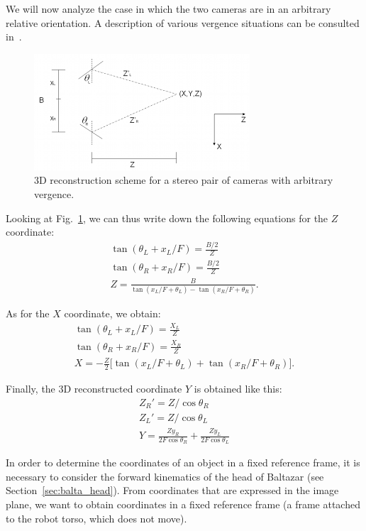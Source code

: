 We will now analyze the case in which the two cameras are in an arbitrary relative orientation. A description of various vergence situations can be consulted in~\cite{bernardino:1999}.

\begin{figure}
\centering
\includegraphics{figures/vergence}
\caption[3D reconstruction scheme]{3D reconstruction scheme for a stereo pair of cameras with arbitrary vergence.}
\label{img:vergence}
\end{figure}

Looking at Fig.~\ref{img:vergence}, we can thus write down the following equations for the $Z$ coordinate:
%
\begin{gather}
\tan (\theta_L + x_L / F) = \frac{B/2}{Z} \\
\tan (\theta_R + x_R / F) = \frac{B/2}{Z} \\
Z = \frac{B}{\tan(x_L / F + \theta_L) - \tan(x_R / F + \theta_R)}.
\end{gather}

As for the $X$ coordinate, we obtain:
%
\begin{gather}
\tan(\theta_L + x_L / F) = \frac{X_L}{Z} \\
\tan(\theta_R + x_R / F) = \frac{X_R}{Z} \\
X = - \frac{Z}{2} \bigl[ \tan(x_L / F + \theta_L) + \tan(x_R / F + \theta_R) \bigr].
\end{gather}

Finally, the 3D reconstructed coordinate $Y$ is obtained like this:
%
\begin{gather}
Z_{R}' = Z / \cos \theta_R \\
Z_{L}' = Z / \cos \theta_L \\
Y = \frac{Z y_R}{2 F \cos \theta_R} + \frac{Z y_L}{2 F \cos \theta_L}
\end{gather}










In order to determine the coordinates of an object in a fixed reference frame, it is necessary to consider the forward kinematics of the head of Baltazar (see Section~\ref{sec:balta_head}). From coordinates that are expressed in the image plane, we want to obtain coordinates in a fixed reference frame (a frame attached to the robot torso, which does not move).

